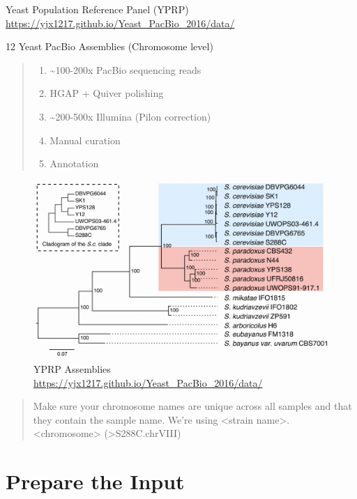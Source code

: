 \documentclass[
]{book}
\providecommand{\tightlist}{%
  \setlength{\itemsep}{0pt}\setlength{\parskip}{0pt}}
\begin{document}
Yeast Population Reference Panel (YPRP) \url{https://yjx1217.github.io/Yeast_PacBio_2016/data/}

12 Yeast PacBio Assemblies (Chromosome level)

\begin{quote}
\begin{enumerate}
\def\labelenumi{\arabic{enumi}.}
\tightlist
\item
  \textasciitilde100-200x PacBio sequencing reads
\item
  HGAP + Quiver polishing\\
\item
  \textasciitilde200-500x Illumina (Pilon correction)\\
\item
  Manual curation\\
\item
  Annotation
\end{enumerate}
\end{quote}

\begin{figure}
\centering
\includegraphics[width=1\textwidth,height=\textheight]{./Figures/Yeast.png}
\caption{YPRP Assemblies \url{https://yjx1217.github.io/Yeast_PacBio_2016/data/}}
\end{figure}

\begin{quote}
Make sure your chromosome names are unique across all samples and that they contain the sample name. We're using \textless strain name\textgreater.\textless chromosome\textgreater{} (\textgreater S288C.chrVIII)
\end{quote}

\hypertarget{prepare-the-input}{%
\section{Prepare the Input}\label{prepare-the-input}}
\end{document}
